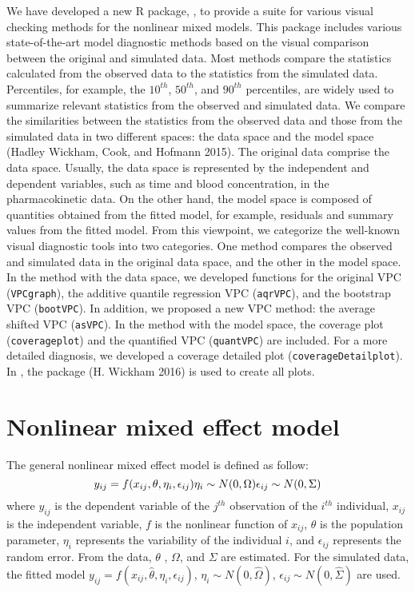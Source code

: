 We have developed a new R package, , to provide a suite for various visual checking methods for the nonlinear mixed models. This package includes various state-of-the-art model diagnostic methods based on the visual comparison between the original and simulated data. Most methods compare the statistics calculated from the observed data to the statistics from the simulated data. Percentiles, for example, the \(10^{th}\), \(50^{th}\), and \(90^{th}\) percentiles, are widely used to summarize relevant statistics from the observed and simulated data. We compare the similarities between the statistics from the observed data and those from the simulated data in two different spaces: the data space and the model space (Hadley Wickham, Cook, and Hofmann 2015). The original data comprise the data space. Usually, the data space is represented by the independent and dependent variables, such as time and blood concentration, in the pharmacokinetic data. On the other hand, the model space is composed of quantities obtained from the fitted model, for example, residuals and summary values from the fitted model. From this viewpoint, we categorize the well-known visual diagnostic tools into two categories. One method compares the observed and simulated data in the original data space, and the other in the model space. In the method with the data space, we developed functions for the original VPC (\texttt{VPCgraph}), the additive quantile regression VPC (\texttt{aqrVPC}), and the bootstrap VPC (\texttt{bootVPC}). In addition, we proposed a new VPC method: the average shifted VPC (\texttt{asVPC}). In the method with the model space, the coverage plot (\texttt{coverageplot}) and the quantified VPC (\texttt{quantVPC}) are included. For a more detailed diagnosis, we developed a coverage detailed plot (\texttt{coverageDetailplot}). In , the  package (H. Wickham 2016) is used to create all plots.

\hypertarget{nonlinear-mixed-effect-model}{%
\section{Nonlinear mixed effect model}\label{nonlinear-mixed-effect-model}}

The general nonlinear mixed effect model is defined as follow:
\[
y_{ij} = f(x_{ij}, \theta, \eta_i, \epsilon_{ij}) \\
\eta_i \sim N(0,\Omega) \nonumber\\
\epsilon_{ij}  \sim N(0, \Sigma)\nonumber
\]
where \(y_{ij}\) is the dependent variable of the \(j^{th}\) observation of the \(i^{th}\) individual, \(x_{ij}\) is the independent variable, \(f\) is the nonlinear function of \(x_{ij}\), \(\theta\) is the population parameter, \(\eta_i\) represents the variability of the individual \(i\), and \(\epsilon_{ij}\) represents the random error. From the data, \(\theta\) , \(\Omega\), and \(\Sigma\) are estimated. For the simulated data, the fitted model \(y_{ij} = f(x_{ij}, \hat{\theta}, \eta_i, \epsilon_{ij})\), \(\eta_i \sim N(0,\hat\Omega)\), \(\epsilon_{ij} \sim N(0, \hat\Sigma)\) are used.

